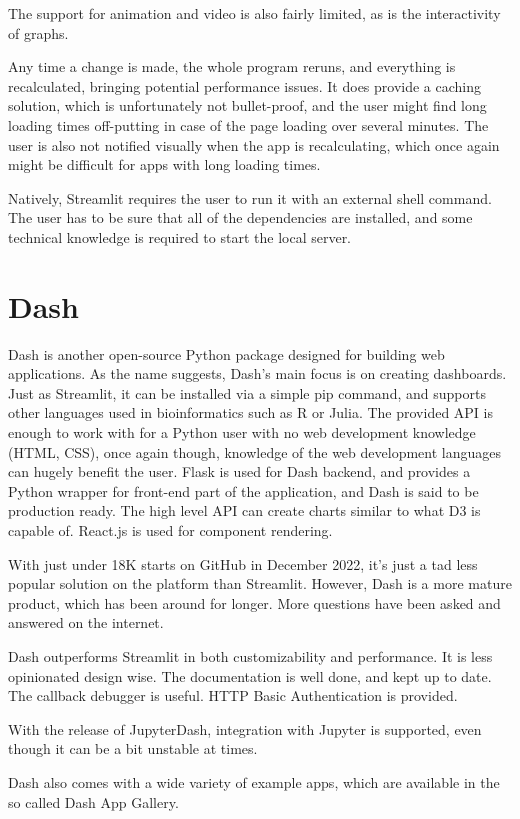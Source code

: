 The support for animation and video is also fairly limited, as is the interactivity of graphs. 

Any time a change is made, the whole program reruns, and everything is recalculated, bringing potential performance issues. It does provide a caching solution, which is unfortunately not bullet-proof, and the user might find long loading times off-putting in case of the page loading over several minutes. The user is also not notified visually when the app is recalculating, which once again might be difficult for apps with long loading times.

Natively, Streamlit requires the user to run it with an external shell command. The user has to be sure that all of the dependencies are installed, and some technical knowledge is required to start the local server. 

\section{Dash}
\label{sec:dash}
Dash is another open-source Python package designed for building web applications. As the name suggests, Dash's main focus is on creating dashboards. Just as Streamlit, it can be installed via a simple pip command, and supports other languages used in bioinformatics such as R or Julia. The provided API is enough to work with for a Python user with no web development knowledge (HTML, CSS), once again though, knowledge of the web development languages can hugely benefit the user. Flask is used for Dash backend, and provides a Python wrapper for front-end part of the application, and Dash is said to be production ready. The high level API can create charts similar to what D3 is capable of. React.js is used for component rendering.

With just under 18K starts on GitHub in December 2022, it's just a tad less popular solution on the platform than Streamlit. However, Dash is a more mature product, which has been around for longer. More questions have been asked and answered on the internet. 

Dash outperforms Streamlit in both customizability and performance. It is less opinionated design wise. The documentation is well done, and kept up to date. The callback debugger is useful. HTTP Basic Authentication is provided. 

With the release of JupyterDash, integration with Jupyter is supported, even though it can be a bit unstable at times.

Dash also comes with a wide variety of example apps, which are available in the so called Dash App Gallery.

